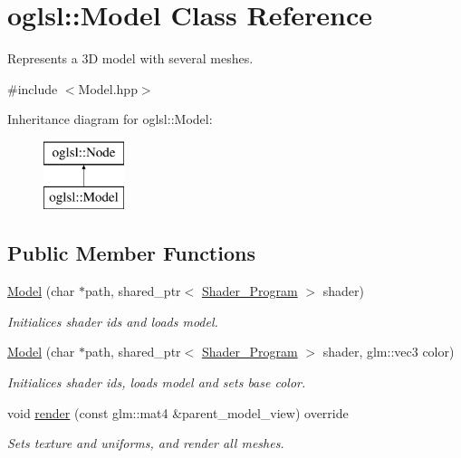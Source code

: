 \hypertarget{classoglsl_1_1_model}{}\section{oglsl\+:\+:Model Class Reference}
\label{classoglsl_1_1_model}


Represents a 3D model with several meshes.  




{\ttfamily \#include $<$Model.\+hpp$>$}

Inheritance diagram for oglsl\+:\+:Model\+:\begin{figure}[H]
\begin{center}
\leavevmode
\includegraphics[height=2.000000cm]{classoglsl_1_1_model}
\end{center}
\end{figure}
\subsection*{Public Member Functions}
\begin{DoxyCompactItemize}
\item 
\mbox{\hyperlink{classoglsl_1_1_model_a1d1c934e59303cf5782cc3b45f80e462}{Model}} (char $\ast$path, shared\+\_\+ptr$<$ \mbox{\hyperlink{classoglsl_1_1_shader___program}{Shader\+\_\+\+Program}} $>$ shader)
\begin{DoxyCompactList}\small\item\em Initialices shader ids and loads model. \end{DoxyCompactList}\item 
\mbox{\hyperlink{classoglsl_1_1_model_ab3c8fe28157eaa2fd01646a0fc081f0f}{Model}} (char $\ast$path, shared\+\_\+ptr$<$ \mbox{\hyperlink{classoglsl_1_1_shader___program}{Shader\+\_\+\+Program}} $>$ shader, glm\+::vec3 color)
\begin{DoxyCompactList}\small\item\em Initialices shader ids, loads model and sets base color. \end{DoxyCompactList}\item 
void \mbox{\hyperlink{classoglsl_1_1_model_a22b769c49add4d10774e90466338c695}{render}} (const glm\+::mat4 \&parent\+\_\+model\+\_\+view) override
\begin{DoxyCompactList}\small\item\em Sets texture and uniforms, and render all meshes. \end{DoxyCompactList}\end{DoxyCompactItemize}
